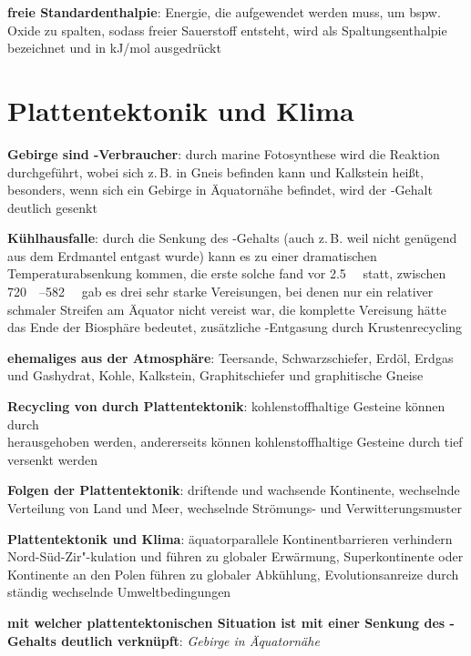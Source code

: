 \textbf{freie Standardenthalpie}:
Energie, die aufgewendet werden muss, um bspw. Oxide zu spalten, sodass freier Sauerstoff entsteht,
wird als Spaltungsenthalpie bezeichnet und in \si{\kilo\joule/\mol} ausgedrückt

\pagebreak

\section{%
    Plattentektonik und Klima%
}

\textbf{Gebirge sind -Verbraucher}:
durch marine Fotosynthese wird die Reaktion
 durchgeführt,
wobei sich  z.\,B. in Gneis befinden kann und  Kalkstein heißt,
besonders, wenn sich ein Gebirge in Äquatornähe befindet, wird der -Gehalt deutlich gesenkt

\textbf{Kühlhausfalle}:
durch die Senkung des -Gehalts
(auch z.\,B. weil nicht genügend  aus dem Erdmantel entgast wurde)
kann es zu einer dramatischen Temperaturabsenkung kommen,
die erste solche fand vor \SI{2.5}{\mega\year} statt,
zwischen \SIrange{720}{582}{\mega\year} gab es drei sehr starke Vereisungen,
bei denen nur ein relativer schmaler Streifen am Äquator nicht vereist war,
die komplette Vereisung hätte das Ende der Biosphäre bedeutet,
zusätzliche -Entgasung durch Krustenrecycling

\textbf{ehemaliges  aus der Atmosphäre}:
Teersande,
Schwarzschiefer,
Erdöl,
Erdgas und Gashydrat,
Kohle,
Kalkstein,
Graphitschiefer und graphitische Gneise

\textbf{Recycling von  durch Plattentektonik}:
kohlenstoffhaltige Gesteine können durch\\
herausgehoben werden,
andererseits können kohlenstoffhaltige Gesteine durch
tief versenkt werden

\textbf{Folgen der Plattentektonik}:
driftende und wachsende Kontinente,
wechselnde Verteilung von Land und Meer,
wechselnde Strömungs- und Verwitterungsmuster

\textbf{Plattentektonik und Klima}:
äquatorparallele Kontinentbarrieren verhindern Nord-Süd-Zir"-kulation und führen zu
globaler Erwärmung,
Superkontinente oder Kontinente an den Polen führen zu globaler Abkühlung,
Evolutionsanreize durch ständig wechselnde Umweltbedingungen

\begin{wichtig}
    \item
    \textbf{mit welcher plattentektonischen Situation ist mit einer Senkung des -Gehalts
    deutlich verknüpft}:
    \emph{Gebirge in Äquatornähe}
\end{wichtig}

